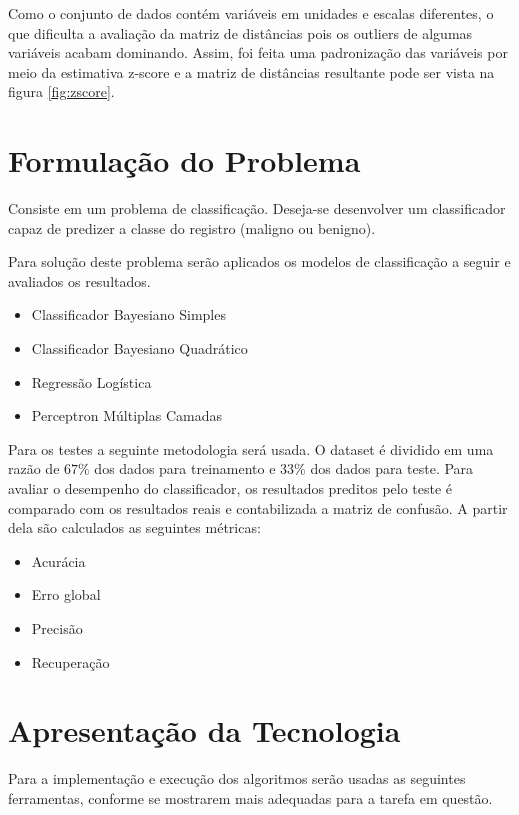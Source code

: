 \documentclass[11pt,a4paper]{article}
\numberwithin{equation}{section}
\begin{document}
Como o conjunto de dados contém variáveis em unidades e escalas diferentes, o que dificulta a avaliação da matriz de distâncias pois os outliers de algumas variáveis acabam dominando. Assim, foi feita uma padronização das variáveis por meio da estimativa z-score e a matriz de distâncias resultante pode ser vista na figura \ref{fig:zscore}.

\section{Formulação do Problema}
Consiste em um problema de classificação. Deseja-se desenvolver um classificador capaz de predizer a classe do registro (maligno ou benigno).

Para solução deste problema serão aplicados os modelos de classificação a seguir e avaliados os resultados.

\begin{itemize}
\item Classificador Bayesiano Simples
\item Classificador Bayesiano Quadrático
\item Regressão Logística
\item Perceptron Múltiplas Camadas
\end{itemize}

Para os testes a seguinte metodologia será usada. O dataset é dividido em uma razão de $67\%$ dos dados para treinamento e $33\%$ dos dados para teste. Para avaliar o desempenho do classificador, os resultados preditos pelo teste é comparado com os resultados reais e contabilizada a matriz de confusão. A partir dela são calculados as seguintes métricas:
\begin{itemize}
\item Acurácia
\item Erro global
\item Precisão 
\item Recuperação
\end{itemize}

\section{Apresentação da Tecnologia}
Para a implementação e execução dos algoritmos serão usadas as seguintes ferramentas, conforme se mostrarem mais adequadas para a tarefa em questão.
\end{document}
